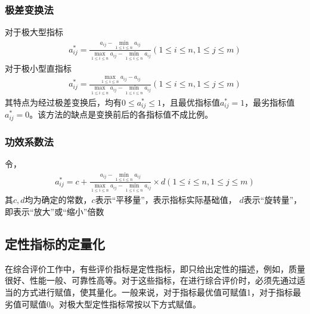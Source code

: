 \documentclass[letterpaper,10pt,english]{sphinxmanual}
\begin{document}
\subsubsection{极差变换法}
\label{\detokenize{docs/evaluation_model:id15}}
对于极大型指标
\begin{equation*}
\begin{split}
a_{i j}^{*}=\frac{a_{i j}-\min _{1 \leq i \leq n} a_{i j}}{\max _{1 \leq i \leq n} a_{i j}-\min _{1 \leq i \leq n} a_{i j}}(1 \leq i \leq n, 1 \leq j \leq m)
\end{split}
\end{equation*}
对于极小型直指标
\begin{equation*}
\begin{split}
a_{i j}^{*}=\frac{\max _{1 \leq i \leq n} a_{i j}-a_{i j}}{\max _{1 \leq i \leq n} a_{i j}-\min _{1 \leq i \leq n} a_{i j}}(1 \leq i \leq n, 1 \leq j \leq m)
\end{split}
\end{equation*}
其特点为经过极差变换后，均有\(0 \leq a_{i j}^{*} \leq 1\)，且最优指标值\(a_{i j}^{*}=1\)，最劣指标值\(a_{i j}^{*}=0\)。该方法的缺点是变换前后的各指标值不成比例。


\subsubsection{功效系数法}
\label{\detokenize{docs/evaluation_model:id16}}
令，
\begin{equation*}
\begin{split}
a_{i j}^{*}=c+\frac{a_{i j}-\min _{1 \leq i \leq n} a_{i j}}{\max _{1 \leq i \leq n} a_{i j}-\min _{1 \leq i \leq n} a_{i j}} \times d(1 \leq i \leq n, 1 \leq j \leq m)
\end{split}
\end{equation*}
其\(c,d\)均为确定的常数，\(c\)表示“平移量”，表示指标实际基础值， \(d\)表示“旋转量”，即表示“放大”或“缩小”倍数


\subsection{定性指标的定量化}
\label{\detokenize{docs/evaluation_model:content-choose-4}}\label{\detokenize{docs/evaluation_model:id17}}
在综合评价工作中，有些评价指标是定性指标，即只给出定性的描述，例如，质量很好、性能一般、可靠性高等。对于这些指标，在进行综合评价时，必须先通过适当的方式进行赋值，使其量化。一般来说，对于指标最优值可赋值1，对于指标最劣值可赋值0。对极大型定性指标常按以下方式赋值。
\end{document}
